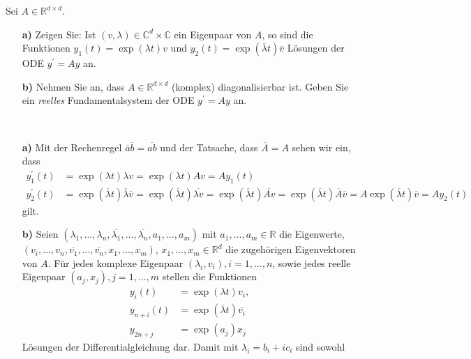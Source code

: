 \begin{exercise}
Sei $A \in \mathbb{R}^{d\times d}$.
\begin{itemize}
  \item [\textbf{a)}]Zeigen Sie: Ist $(v,\lambda) \in \mathbb{C}^d
  \times \mathbb{C}$ ein Eigenpaar von $A$, so sind die Funktionen
  $y_1(t) = \exp(\lambda t)v$ und $y_2(t) = \exp(\overline{\lambda}t)\overline{v}$
  Lösungen der ODE $y^{\prime} = Ay$ an.
  \item [\textbf{b)}] Nehmen Sie an, dass $A \in \mathbb{R}^
  {d \times d}$ (komplex) diagonalisierbar ist. Geben Sie ein
  \textit{reelles} Fundamentalsystem der ODE $y^{\prime} = Ay$ an.
\end{itemize}
\end{exercise}
\begin{solution}
\leavevmode \\
\begin{itemize}
  \item [\textbf{a)}]
  Mit der Rechenregel $\overline{a}\overline{b} = \overline{ab}$ und der Tatsache, dass $\overline{A} = A$
  sehen wir ein, dass
  \begin{align*}
    y_1^{\prime}(t) &= \exp(\lambda t)\lambda v = \exp(\lambda t)A v = Ay_1(t) \\
    y_2^{\prime}(t) &= \exp(\overline{\lambda}t)\overline{\lambda}\overline{v} = \exp(\overline{\lambda}t) \overline{\lambda v} =
    \exp(\overline{\lambda}t) \overline{Av} =  \exp(\overline{\lambda}t) \overline{A}\overline{v} = A\exp(\overline{\lambda}t)\overline{v} = Ay_2(t)
  \end{align*}
  gilt.
  \item [\textbf{b)}]
  Seien $(\lambda_1,\dots,\lambda_n,\overline{\lambda_1},\dots,\overline{\lambda_n},a_1,\dots,a_m)$
  mit $a_1,\dots,a_m \in \mathbb{R}$ die Eigenwerte, \\
  $(v_i,\dots,v_n,\overline{v_1},\dots,\overline{v_n},x_1,\dots,x_m)$, $x_1,\dots,x_m \in \mathbb{R}^d$
  die zugehörigen Eigenvektoren von $A$.
  Für jedes komplexe Eigenpaar $(\lambda_i, v_i), i = 1,\dots,n$, sowie jedes
  reelle Eigenpaar $(a_j,x_j), j = 1,\dots,m$ stellen die Funktionen
  \begin{align*}
    y_{i}(t) &= \exp(\lambda t)v_i, \\
    y_{n + i}(t) &= \exp(\overline{\lambda} t)\overline{v_i} \\
    y_{2n + j} &= \exp(a_j)x_j
  \end{align*}
  Lösungen der Differentialgleichung dar. Damit mit $\lambda_i = b_i + ic_i$ sind sowohl

\end{itemize}
\end{solution}
